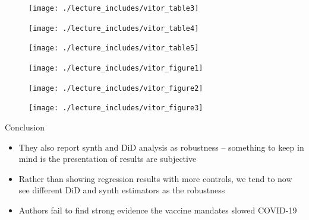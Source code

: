 \documentclass{beamer}
\begin{document}
\begin{frame}[plain]

	\begin{figure}
	\texttt{[image: ./lecture\_includes/vitor\_table3]}
	\end{figure}

\end{frame}


\begin{frame}[plain]

	\begin{figure}
	\texttt{[image: ./lecture\_includes/vitor\_table4]}
	\end{figure}

\end{frame}


\begin{frame}[plain]

	\begin{figure}
	\texttt{[image: ./lecture\_includes/vitor\_table5]}
	\end{figure}

\end{frame}


\begin{frame}[plain]

	\begin{figure}
	\texttt{[image: ./lecture\_includes/vitor\_figure1]}
	\end{figure}

\end{frame}


\begin{frame}[plain]

	\begin{figure}
	\texttt{[image: ./lecture\_includes/vitor\_figure2]}
	\end{figure}

\end{frame}


\begin{frame}[plain]

	\begin{figure}
	\texttt{[image: ./lecture\_includes/vitor\_figure3]}
	\end{figure}

\end{frame}


\begin{frame}{Conclusion}

\begin{itemize}

\item They also report synth and DiD analysis as robustness -- something to keep in mind is the presentation of results are subjective
\item Rather than showing regression results with more controls, we tend to now see different DiD and synth estimators as the robustness
\item Authors fail to find strong evidence the vaccine mandates slowed COVID-19

\end{itemize}

\end{frame}
\end{document}
